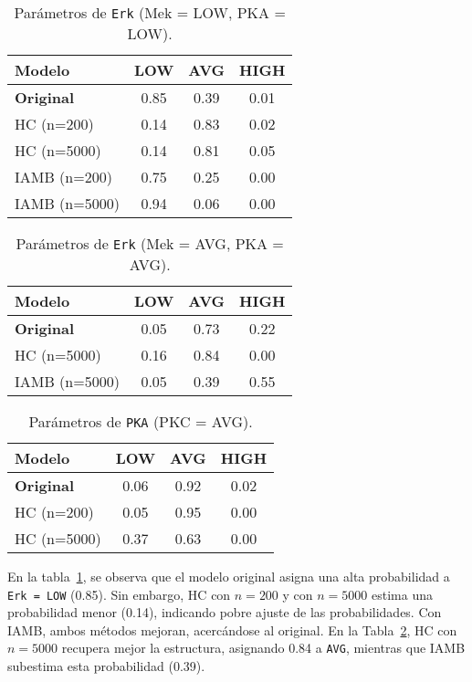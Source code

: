 \documentclass[12pt,letterpaper]{article}
\begin{document}
\begin{table}[htp]
    \centering
    \begin{tabular}{l|c|c|c}
        \hline
        \textbf{Modelo}   & \textbf{LOW} & \textbf{AVG} & \textbf{HIGH} \\ \hline
        \textbf{Original} & 0.85         & 0.39         & 0.01          \\ \hline
        HC (n=200)        & 0.14         & 0.83         & 0.02          \\ \hline
        HC (n=5000)       & 0.14         & 0.81         & 0.05          \\ \hline
        IAMB (n=200)      & 0.75         & 0.25         & 0.00          \\ \hline
        IAMB (n=5000)     & 0.94         & 0.06         & 0.00          \\ \hline
    \end{tabular}
    \caption{Parámetros de \texttt{Erk} (Mek = LOW, PKA = LOW).}
    \label{tab:erk_low_low}
\end{table}

\begin{table}[htp]
    \centering
    \begin{tabular}{l|c|c|c}
        \hline
        \textbf{Modelo}   & \textbf{LOW} & \textbf{AVG} & \textbf{HIGH} \\ \hline
        \textbf{Original} & 0.05         & 0.73         & 0.22          \\ \hline
        HC (n=5000)       & 0.16         & 0.84         & 0.00          \\ \hline
        IAMB (n=5000)     & 0.05         & 0.39         & 0.55          \\ \hline
    \end{tabular}
    \caption{Parámetros de \texttt{Erk} (Mek = AVG, PKA = AVG).}
    \label{tab:erk_avg_avg}
\end{table}

\begin{table}[htp]
    \centering
    \begin{tabular}{l|c|c|c}
        \hline
        \textbf{Modelo}   & \textbf{LOW} & \textbf{AVG} & \textbf{HIGH} \\ \hline
        \textbf{Original} & 0.06         & 0.92         & 0.02          \\ \hline
        HC (n=200)        & 0.05         & 0.95         & 0.00          \\ \hline
        HC (n=5000)       & 0.37         & 0.63         & 0.00          \\ \hline
    \end{tabular}
    \caption{Parámetros de \texttt{PKA} (PKC = AVG).}
    \label{tab:pka_avg}
\end{table}


En la tabla~\ref{tab:erk_low_low}, se observa que el modelo original asigna una alta probabilidad a \texttt{Erk = LOW} (0.85). Sin embargo, HC con \( n = 200 \) y con \( n = 5000 \) estima una probabilidad menor (0.14), indicando pobre ajuste de las probabilidades. Con IAMB, ambos métodos mejoran, acercándose al original. En la Tabla~\ref{tab:erk_avg_avg}, HC con \( n = 5000 \) recupera mejor la estructura, asignando 0.84 a \texttt{AVG}, mientras que IAMB subestima esta probabilidad (0.39).
\end{document}
